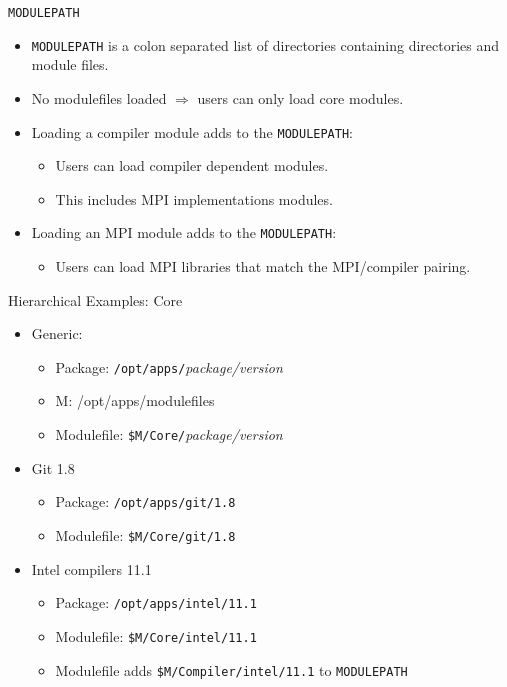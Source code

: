 \documentclass{beamer}
\begin{document}
\begin{frame}{\texttt{MODULEPATH}}
  \begin{itemize}
    \item \texttt{MODULEPATH} is a colon separated list of directories
      containing directories and module files.
    \item No modulefiles loaded $\Rightarrow$ users can only load core modules.
    \item Loading a compiler module adds to the \texttt{MODULEPATH}:
      \begin{itemize}
        \item Users can load compiler dependent modules.
        \item This includes MPI implementations modules.
      \end{itemize}
    \item Loading an MPI module adds to the \texttt{MODULEPATH}:
      \begin{itemize}
        \item Users can load MPI libraries that match the MPI/compiler pairing.
      \end{itemize}
  \end{itemize}
\end{frame}


\begin{frame}{Hierarchical Examples: Core}
  \begin{itemize}
    \item Generic:
      \begin{itemize}
        \item Package: \texttt{/opt/apps/}\emph{package/version}
        \item M: {\color{blue}/opt/apps/modulefiles}
        \item Modulefile: \texttt{{\color{blue}\$M}/Core/}\emph{package/version}
      \end{itemize}
    \item Git 1.8
      \begin{itemize}
        \item Package: \texttt{/opt/apps/git/1.8}
        \item Modulefile: \texttt{{\color{blue}\$M}/Core/git/1.8}
      \end{itemize}
    \item Intel compilers 11.1
      \begin{itemize}
        \item Package: \texttt{/opt/apps/intel/11.1}
        \item Modulefile: \texttt{{\color{blue}\$M}/Core/intel/11.1}
        \item Modulefile adds \texttt{{\color{blue}\$M}/Compiler/intel/11.1} to \texttt{MODULEPATH}
      \end{itemize}
  \end{itemize}
\end{frame}
\end{document}
